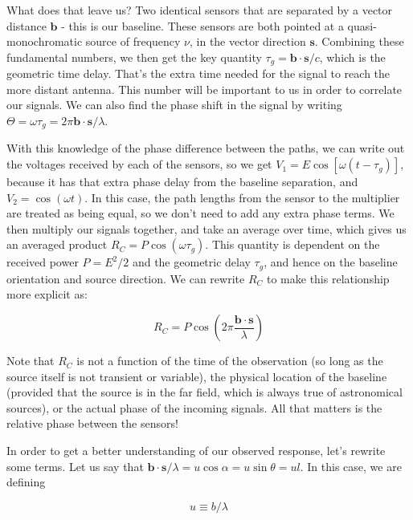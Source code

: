 What does that leave us? Two identical sensors that are separated by a vector 
distance $\mathbf{b}$ - this is our baseline. These sensors are both pointed at 
a quasi-monochromatic source of frequency $\nu$, in the vector direction 
$\mathbf{s}$.  Combining these fundamental numbers, we then get the key 
quantity $\tau_g = \mathbf{b} \cdot \mathbf{s} / c$, which is the geometric 
time delay. That's the extra time needed for the signal to reach the more 
distant antenna. This number will be important to us in order to correlate our 
signals.  We can also find the phase shift in the signal by writing $\Theta = 
\omega \tau_g = 2 \pi \mathbf{b} \cdot \mathbf{s} / \lambda$.

With this knowledge of the phase difference between the paths, we can write out 
the voltages received by each of the sensors, so we get $V_1 = E \cos{[\omega(t 
- \tau_g)]}$, because it has that extra phase delay from the baseline 
separation, and $V_2 = \cos{(\omega t)}$. In this case, the path lengths from 
the sensor to the multiplier are treated as being equal, so we don't need to 
add any extra phase terms. We then multiply our signals together, and take an 
average over time, which gives us an averaged product $R_C = P \cos{(\omega 
\tau_g)}$. This quantity is dependent on the received power $P = E^2/2$ and the 
geometric delay $\tau_g$, and hence on the baseline orientation and source 
direction. We can rewrite $R_C$ to make this relationship more explicit as:

\begin{equation}
    R_C = P \cos{(2 \pi \frac{\mathbf{b} \cdot \mathbf{s}}{\lambda})}
    \label{eq:R_C}
\end{equation}

Note that $R_C$ is not a function of the time of the observation (so long as 
the source itself is not transient or variable), the physical location of the 
baseline (provided that the source is in the far field, which is always true of 
astronomical sources), or the actual phase of the incoming signals.  All that 
matters is the relative phase between the sensors!

In order to get a better understanding of our observed response, let's rewrite 
some terms. Let us say that $\mathbf{b} \cdot \mathbf{s}/\lambda = 
u\cos{\alpha} = u\sin{\theta} = ul$. In this case, we are defining 

\begin{equation}
    u \equiv b/\lambda
    \label{eq:u}
\end{equation}

